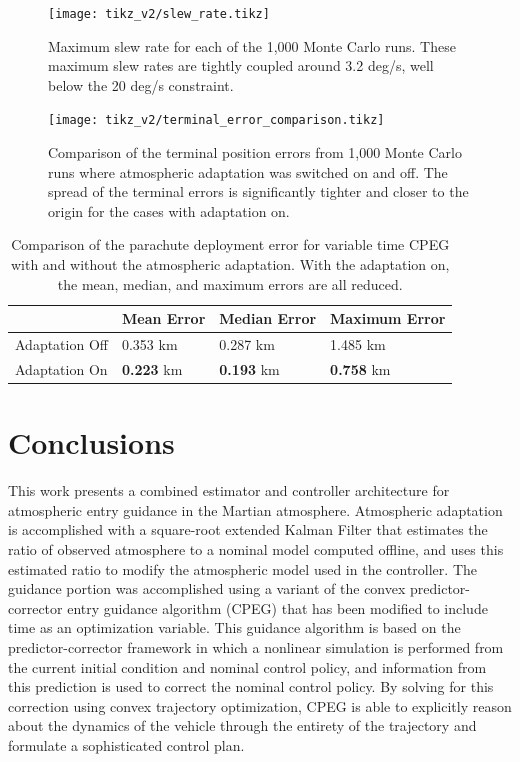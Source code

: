 \begin{figure}
    \centering
    \texttt{[image: tikz\_v2/slew\_rate.tikz]}
    \caption{Maximum slew rate for each of the 1,000 Monte Carlo runs. These maximum slew rates are tightly coupled around 3.2 deg/s, well below the 20 deg/s constraint.}
    \label{fig:slew_rate}
\end{figure}
\begin{figure}
    \centering
    \texttt{[image: tikz\_v2/terminal\_error\_comparison.tikz]}
    \caption{Comparison of the terminal position errors from 1,000 Monte Carlo runs where atmospheric adaptation was switched on and off. The spread of the terminal errors is significantly tighter and closer to the origin for the cases with adaptation on.}
    \label{fig:terminal_errors}
\end{figure}
\begin{table}[H]
\centering
\caption{Comparison of the parachute deployment error for variable time CPEG with and without the atmospheric adaptation. With the adaptation on, the mean, median, and maximum errors are all reduced.}
\begin{tabular}{llll} \hline \hline 
           & Mean Error & Median Error & Maximum Error \\ \hline
Adaptation Off  &   0.353 km         &   0.287  km         &   1.485 km            \\
Adaptation On &  \textbf{0.223} km         & \textbf{0.193}   km          &  \textbf{0.758} km           \\ \hline \hline 
\end{tabular}
\label{term_err_tab}
\end{table}
\section{Conclusions}\label{section7}

This work presents a combined estimator and controller architecture for atmospheric entry guidance in the Martian atmosphere. Atmospheric adaptation is accomplished with a square-root extended Kalman Filter that estimates the ratio of observed atmosphere to a nominal model computed offline, and uses this estimated ratio to modify the atmospheric model used in the controller. The guidance portion was accomplished using a variant of the convex predictor-corrector entry guidance algorithm (CPEG) that has been modified to include time as an optimization variable. This guidance algorithm is based on the predictor-corrector framework in which a nonlinear simulation is performed from the current initial condition and nominal control policy, and information from this prediction is used to correct the nominal control policy. By solving for this correction using convex trajectory optimization, CPEG is able to explicitly reason about the dynamics of the vehicle through the entirety of the trajectory and formulate a sophisticated control plan. 

